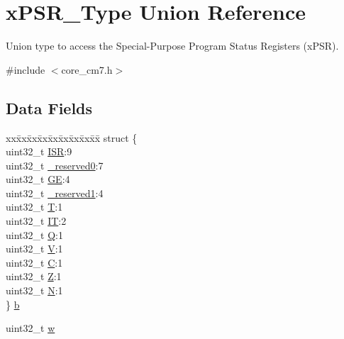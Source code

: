\hypertarget{unionxPSR__Type}{}\section{x\+P\+S\+R\+\_\+\+Type Union Reference}
\label{unionxPSR__Type}


Union type to access the Special-\/\+Purpose Program Status Registers (x\+P\+SR).  




{\ttfamily \#include $<$core\+\_\+cm7.\+h$>$}

\subsection*{Data Fields}
\begin{DoxyCompactItemize}
\item 
\begin{tabbing}
xx\=xx\=xx\=xx\=xx\=xx\=xx\=xx\=xx\=\kill
struct \{\\
\>uint32\_t \mbox{\hyperlink{unionxPSR__Type_a3e9120dcf1a829fc8d2302b4d0673970}{ISR}}:9\\
\>uint32\_t \mbox{\hyperlink{unionxPSR__Type_af438e0f407357e914a70b5bd4d6a97c5}{\_reserved0}}:7\\
\>uint32\_t \mbox{\hyperlink{unionxPSR__Type_a2d0ec4ccae337c1df5658f8cf4632e76}{GE}}:4\\
\>uint32\_t \mbox{\hyperlink{unionxPSR__Type_a790056bb6f20ea16cecc784b0dd19ad6}{\_reserved1}}:4\\
\>uint32\_t \mbox{\hyperlink{unionxPSR__Type_a7eed9fe24ae8d354cd76ae1c1110a658}{T}}:1\\
\>uint32\_t \mbox{\hyperlink{unionxPSR__Type_a3200966922a194d84425e2807a7f1328}{IT}}:2\\
\>uint32\_t \mbox{\hyperlink{unionxPSR__Type_add7cbd2b0abd8954d62cd7831796ac7c}{Q}}:1\\
\>uint32\_t \mbox{\hyperlink{unionxPSR__Type_af14df16ea0690070c45b95f2116b7a0a}{V}}:1\\
\>uint32\_t \mbox{\hyperlink{unionxPSR__Type_a40213a6b5620410cac83b0d89564609d}{C}}:1\\
\>uint32\_t \mbox{\hyperlink{unionxPSR__Type_a1e5d9801013d5146f2e02d9b7b3da562}{Z}}:1\\
\>uint32\_t \mbox{\hyperlink{unionxPSR__Type_a2db9a52f6d42809627d1a7a607c5dbc5}{N}}:1\\
\} \mbox{\hyperlink{unionxPSR__Type_adfd25f02d5b867f9075e25f06f2f4d7d}{b}}\\

\end{tabbing}\item 
uint32\+\_\+t \mbox{\hyperlink{unionxPSR__Type_a1a47176768f45f79076c4f5b1b534bc2}{w}}
\end{DoxyCompactItemize}



